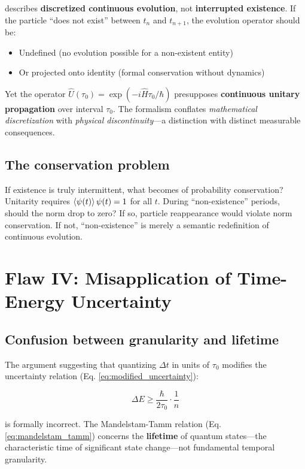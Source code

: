 \documentclass[11pt,a4paper]{article}
\begin{document}
describes \textbf{discretized continuous evolution}, not \textbf{interrupted existence}. If the particle ``does not exist'' between $t_n$ and $t_{n+1}$, the evolution operator should be:
\begin{itemize}
    \item Undefined (no evolution possible for a non-existent entity)
    \item Or projected onto identity (formal conservation without dynamics)
\end{itemize}

Yet the operator $\hat{U}(\tau_0) = \exp(-i\hat{H}\tau_0/\hbar)$ presupposes \textbf{continuous unitary propagation} over interval $\tau_0$. The formalism conflates \textit{mathematical discretization} with \textit{physical discontinuity}---a distinction with distinct measurable consequences.

\subsection{The conservation problem}

If existence is truly intermittent, what becomes of probability conservation? Unitarity requires $\braket{\psi(t)}{\psi(t)} = 1$ for all $t$. During ``non-existence'' periods, should the norm drop to zero? If so, particle reappearance would violate norm conservation. If not, ``non-existence'' is merely a semantic redefinition of continuous evolution.

\section{Flaw IV: Misapplication of Time-Energy Uncertainty}

\subsection{Confusion between granularity and lifetime}

The argument suggesting that quantizing $\Delta t$ in units of $\tau_0$ modifies the uncertainty relation (Eq. \ref{eq:modified_uncertainty}):

\begin{equation}
\Delta E \geq \frac{\hbar}{2\tau_0} \cdot \frac{1}{n}
\end{equation}

is formally incorrect. The Mandelstam-Tamm relation (Eq. \ref{eq:mandelstam_tamm}) concerns the \textbf{lifetime} of quantum states---the characteristic time of significant state change---not fundamental temporal granularity.
\end{document}

